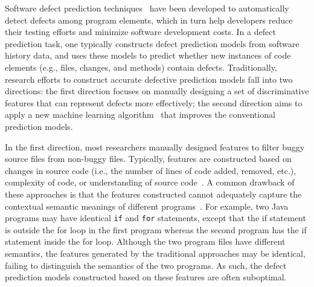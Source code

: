 
Software defect prediction techniques~\cite{hassan2009predicting, jiang2013personalized, zimmermann2007predicting} have been developed to automatically detect defects among program elements, which in turn help developers reduce their testing efforts and minimize
software development costs. In a defect prediction task, one typically constructs
defect prediction models from software history data, and uses these models to predict whether new instances of code elements (e.g., files, changes, and methods) contain defects. 
Traditionally, research efforts to construct accurate defective prediction models fall into two directions:
the first direction focuses on manually designing a set of discriminative features that can represent defects more effectively; the second direction aims to apply a new machine learning algorithm~\cite{bishop2006pattern} that improves the conventional prediction models. 

In the first direction, most researchers manually designed features to filter buggy source files from non-buggy files. Typically, features are constructed based on changes in source code (i.e., the number of lines of code added, removed, etc.), complexity of code, or understanding of source code~\cite{jiang2013personalized, e1994candidate, mccabe1976complexity, chidamber1994metrics, harrison1998evaluation}. 
A common drawback of these approaches is that the features constructed cannot adequately capture the contextual semantic meanings of different programs~\cite{wang2016automatically}. For example, two Java programs may have identical \texttt{if} and \texttt{for} statements, except that the if statement is outside the for loop in the first program whereas the second program has the if statement inside the for loop. Although the two program files have different semantics, the features generated by the traditional approaches may be identical, failing to distinguish the semantics of the two programs. As such, the defect prediction models constructed based on these features are often suboptimal.

